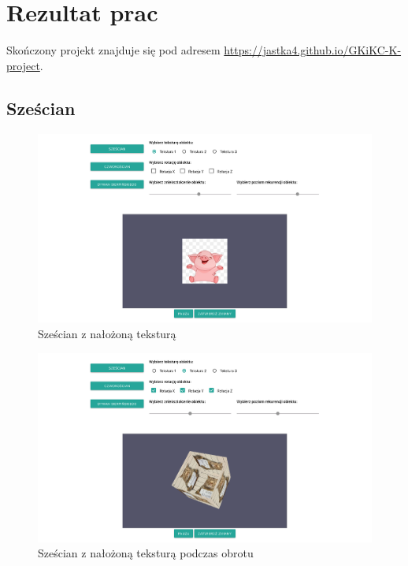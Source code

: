 \documentclass[12pt,a4paper,titlepage]{article}
\begin{document}
\newpage
\section{Rezultat prac}
Skończony projekt znajduje się pod adresem \url{https://jastka4.github.io/GKiKC-K-project}.

\subsection{Sześcian}
\begin{figure}[H]
\centering
\includegraphics[width=14cm]{images/qube_still.png}
\caption{Sześcian z nałożoną teksturą}
\label{fig:eggWithLight}
\end{figure}

\begin{figure}[H]
\centering
\includegraphics[width=14cm]{images/qube_rotating.png}
\caption{Sześcian z nałożoną teksturą podczas obrotu}
\label{fig:eggWithLight}
\end{figure}
\end{document}
